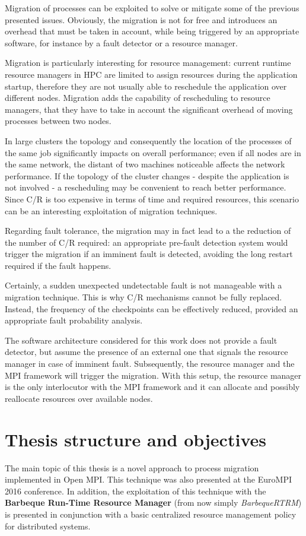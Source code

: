 Migration of processes can be exploited to solve or mitigate some of the
previous presented issues. Obviously, the migration is not for free and
introduces an overhead that must
be taken in account, while being triggered by an appropriate software, for
instance by a fault detector or a resource manager.

Migration is particularly interesting for resource management: current runtime
resource managers in HPC are limited to assign resources during the application
startup, therefore they are not usually able to reschedule the application over
different nodes. Migration adds the capability of rescheduling to resource
managers, that they have to take in account the significant overhead of
moving processes between two nodes.

In large clusters the topology and consequently the location of the processes
of the same job significantly impacts on overall performance; even if
all nodes are in the same network, the distant of two machines noticeable
affects the network performance. If the topology of the cluster changes -
despite the application is not involved - a rescheduling may be convenient
to reach better performance. Since C/R is too expensive in terms of time and
required resources, this scenario can be an interesting exploitation of
migration techniques.

Regarding fault tolerance, the migration may in fact lead to a the reduction
of the number of C/R required:
an appropriate pre-fault detection system would trigger the migration if an
imminent fault is detected, avoiding the long restart required if the fault
happens.

Certainly, a sudden unexpected undetectable fault is not manageable with
a migration technique. This is why C/R mechanisms cannot be fully replaced.
Instead, the frequency of the checkpoints can be effectively reduced,
provided an appropriate fault probability analysis.

The software architecture considered for this work does not provide a fault
detector, but assume the presence of an external one that signals the resource
manager in case of imminent fault. Subsequently, the resource manager and the
MPI framework will trigger the migration. With this setup, the resource
manager is the only interlocutor with the MPI framework and it can allocate
and possibly reallocate resources over available nodes.

\section{Thesis structure and objectives}
The main topic of this thesis is a novel approach to process migration
implemented in Open MPI. This technique was also presented at the EuroMPI 2016
conference\cite{myEuroMPI}. In addition, the exploitation of this technique
with the \textbf{Barbeque Run-Time Resource Manager} (from now simply
\emph{BarbequeRTRM}) is presented in conjunction with a basic centralized
resource management policy for distributed systems.

